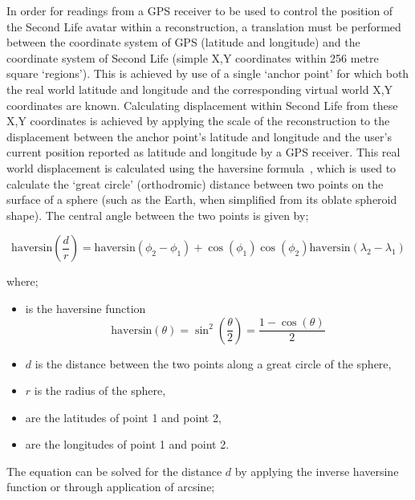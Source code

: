
In order for readings from a GPS receiver to be used to control the position of the Second Life avatar within a reconstruction, a translation must be performed between the coordinate system of GPS (latitude and longitude) and the coordinate system of Second Life (simple X,Y coordinates within 256 metre square `regions'). This is achieved by use of a single `anchor point' for which both the real world latitude and longitude and the corresponding virtual world X,Y coordinates are known. Calculating displacement within Second Life from these X,Y coordinates is achieved by applying the scale of the reconstruction to the displacement between the anchor point's latitude and longitude and the user's current position reported as latitude and longitude by a GPS receiver. This real world displacement is calculated using the haversine formula~\cite{VanBrummelen2012}, which is used to calculate the `great circle' (orthodromic) distance between two points on the surface of a sphere (such as the Earth, when simplified from its oblate spheroid shape). The central angle  between the two points is given by;

\begin{equation}
\label{haversine1}
\text{haversin}\left(\frac{d}{r}\right) = \text{haversin}(\phi_{2}-\phi_{1})+\cos(\phi_{1})\cos(\phi_{2})\text{haversin}(\lambda_{2}-\lambda_{1})
\end{equation}

where;

\begin{itemize}
	\item {} is the haversine function
		\begin{equation}
		\label{harsine2}
			\text{haversin}(\theta) = \sin^{2}\left( \frac{\theta}{2}\right) = \frac{1-\cos(\theta)}{2}
		\end{equation}
	\item $d$ is the distance between the two points along a great circle of the sphere,
	\item $r$ is the radius of the sphere,
	\item {} are the latitudes of point 1 and point 2,
	\item {} are the longitudes of point 1 and point 2.
\end{itemize}

The equation can be solved for the distance $d$ by applying the inverse haversine function or through application of arcsine;

